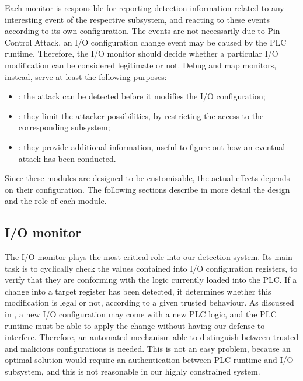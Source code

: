 Each monitor is responsible for reporting detection information related to any interesting event of the respective subsystem,
and reacting to these events according to its own configuration. The events are not necessarily due to Pin Control Attack,
\eg an I/O configuration change event may be caused by the PLC runtime.
Therefore, the I/O monitor should decide whether a particular I/O modification can be considered legitimate or not.
Debug and map monitors, instead, serve at least the following purposes:
\begin{itemize}
	\item {}: the attack can be detected before it modifies the I/O configuration;
	\item {}: they limit the attacker possibilities, by restricting the access to the corresponding subsystem;
	\item {}: they provide additional information, useful to figure out how an eventual attack has been conducted.
\end{itemize}
Since these modules are designed to be customisable, the actual effects depends on their configuration.
The following sections describe in more detail the design and the role of each module.


\subsection{I/O monitor}
\label{sec:io_design}

The I/O monitor plays the most critical role into our detection system.
Its main task is to cyclically check the values contained into I/O configuration registers, to verify that they are conforming with the logic currently loaded into the PLC.
If a change into a target register has been detected, it determines whether this modification is legal or not, according to a given trusted behaviour.
As discussed in , a new I/O configuration may come with a new PLC logic, and the PLC runtime must be able to apply the change without
having our defense to interfere.
Therefore, an automated mechanism able to distinguish between trusted and malicious configurations is needed.
This is not an easy problem, because an optimal solution would require an authentication between PLC runtime and I/O subsystem,
and this is not reasonable in our highly constrained system.

